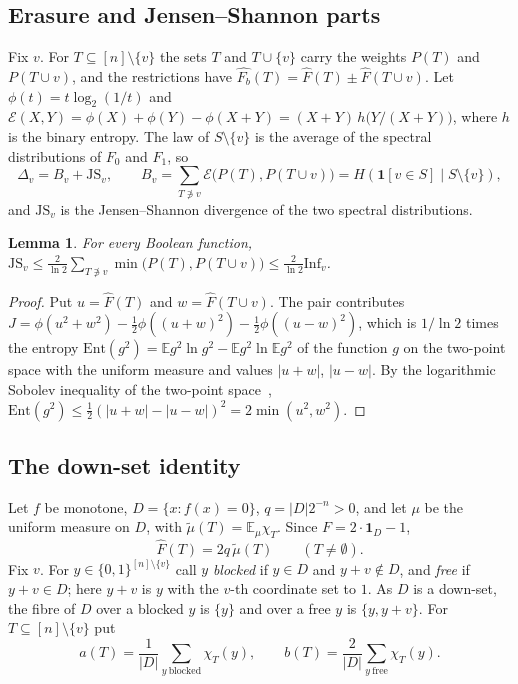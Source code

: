 \documentclass[11pt]{amsart}
\newtheorem{lemma}[theorem]{Lemma}
\theoremstyle{remark}
\newcommand{\E}{\mathbb{E}}
\newcommand{\Inf}{\mathrm{Inf}}
\newcommand{\bits}{\{0,1\}}
\newcommand{\JS}{\mathrm{JS}}
\begin{document}
\subsection{Erasure and Jensen--Shannon parts}
Fix $v$. For $T\subseteq[n]\setminus\{v\}$ the sets $T$ and $T\cup\{v\}$ carry the weights $P(T)$ and $P(T\cup v)$,
and the restrictions have $\widehat{F_b}(T)=\widehat F(T)\pm\widehat F(T\cup v)$. Let $\phi(t)=t\log_2(1/t)$ and
$\mathcal E(X,Y)=\phi(X)+\phi(Y)-\phi(X+Y)=(X+Y)\,h\bigl(Y/(X+Y)\bigr)$, where $h$ is the binary entropy. The law of
$S\setminus\{v\}$ is the average of the spectral distributions of $F_0$ and $F_1$, so
\[
\Delta_v=B_v+\JS_v,\qquad B_v=\sum_{T\not\ni v}\mathcal E\bigl(P(T),P(T\cup v)\bigr)=H(\mathbf 1[v\in S]\mid S\setminus\{v\}),
\]
and $\JS_v$ is the Jensen--Shannon divergence of the two spectral distributions.

\begin{lemma}\label{lem:js}
For every Boolean function, $\JS_v\le\frac{2}{\ln2}\sum_{T\not\ni v}\min\bigl(P(T),P(T\cup v)\bigr)\le\frac2{\ln2}\Inf_v$.
\end{lemma}

\begin{proof}
Put $u=\widehat F(T)$ and $w=\widehat F(T\cup v)$. The pair contributes
$J=\phi(u^2+w^2)-\frac12\phi((u+w)^2)-\frac12\phi((u-w)^2)$, which is $1/\ln2$ times the entropy
$\mathrm{Ent}(g^2)=\E g^2\ln g^2-\E g^2\ln\E g^2$ of the function $g$ on the two-point space with the uniform measure
and values $|u+w|$, $|u-w|$. By the logarithmic Sobolev inequality of the two-point space~\cite{Gro75},
$\mathrm{Ent}(g^2)\le\frac12(|u+w|-|u-w|)^2=2\min(u^2,w^2)$.
\end{proof}

\subsection{The down-set identity}
Let $f$ be monotone, $D=\{x:f(x)=0\}$, $q=|D|2^{-n}>0$, and let $\mu$ be the uniform measure on $D$, with
$\tilde\mu(T)=\E_\mu\chi_T$. Since $F=2\cdot\mathbf 1_D-1$,
\begin{equation}\label{eq:fmu}
\widehat F(T)=2q\,\tilde\mu(T)\qquad(T\neq\emptyset).
\end{equation}
Fix $v$. For $y\in\bits^{[n]\setminus\{v\}}$ call $y$ \emph{blocked} if $y\in D$ and $y+v\notin D$, and \emph{free}
if $y+v\in D$; here $y+v$ is $y$ with the $v$-th coordinate set to $1$. As $D$ is a down-set, the fibre of $D$ over a
blocked $y$ is $\{y\}$ and over a free $y$ is $\{y,y+v\}$. For $T\subseteq[n]\setminus\{v\}$ put
\[
a(T)=\frac1{|D|}\sum_{y\ \mathrm{blocked}}\chi_T(y),\qquad b(T)=\frac2{|D|}\sum_{y\ \mathrm{free}}\chi_T(y).
\]
\end{document}
